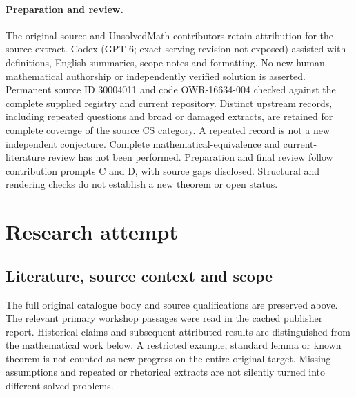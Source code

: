 \documentclass[11pt]{article}
\begin{document}
\paragraph{Preparation and review.}
The original source and UnsolvedMath contributors retain attribution for the source extract. Codex (GPT-6; exact serving revision not exposed) assisted with definitions, English summaries, scope notes and formatting. No new human mathematical authorship or independently verified solution is asserted. Permanent source ID 30004011 and code OWR-16634-004 checked against the complete supplied registry and current repository. Distinct upstream records, including repeated questions and broad or damaged extracts, are retained for complete coverage of the source CS category. A repeated record is not a new independent conjecture. Complete mathematical-equivalence and current-literature review has not been performed. Preparation and final review follow contribution prompts C and D, with source gaps disclosed. Structural and rendering checks do not establish a new theorem or open status.
\label{end:30004011}

\section{Research attempt}
\subsection{Literature, source context and scope}
The full original catalogue body and source qualifications are preserved above. The relevant primary workshop passages were read in the cached publisher report. Historical claims and subsequent attributed results are distinguished from the mathematical work below. A restricted example, standard lemma or known theorem is not counted as new progress on the entire original target. Missing assumptions and repeated or rhetorical extracts are not silently turned into different solved problems.
\end{document}
